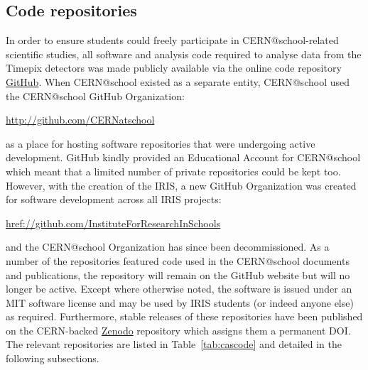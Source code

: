 

\clearpage

\subsection{Code repositories}
\label{sec:cascode}
In order to ensure students could freely participate in
CERN@school-related scientific studies,
all software and analysis code required to analyse data from the Timepix
detectors was made publicly available via the online code repository
\href{http://github.com}{GitHub}.
When CERN@school existed as a separate entity,
CERN@school used the CERN@school GitHub Organization:

\href{http://github.com/CERNatschool}{http://github.com/CERNatschool}

as a place for hosting software repositories that were undergoing active development.
GitHub kindly provided an Educational Account for CERN@school
which meant that a limited number of private repositories could be kept too.
%
However, with the creation of the \acf{IRIS}, a new GitHub Organization
was created for software development across all \ac{IRIS} projects:

\href{http://github.com/InstituteForResearchInSchools}{href://github.com/InstituteForResearchInSchools}

and the CERN@school Organization has since been decommissioned.
As a number of the repositories featured code used
in the CERN@school documents and publications,
the repository will remain on the GitHub website but will no longer
be active.
Except where otherwise noted,
the software is issued under an MIT software license
and may be used by \acs{IRIS} students (or indeed anyone else)
as required.
Furthermore, stable releases of these repositories
have been published on the \acs{CERN}-backed
\href{http://zenodo.org}{Zenodo} repository
which assigns them a permanent \ac{DOI}.
The relevant repositories are listed in
Table~\ref{tab:cascode} and detailed in the
following subsections.



\clearpage



\clearpage
